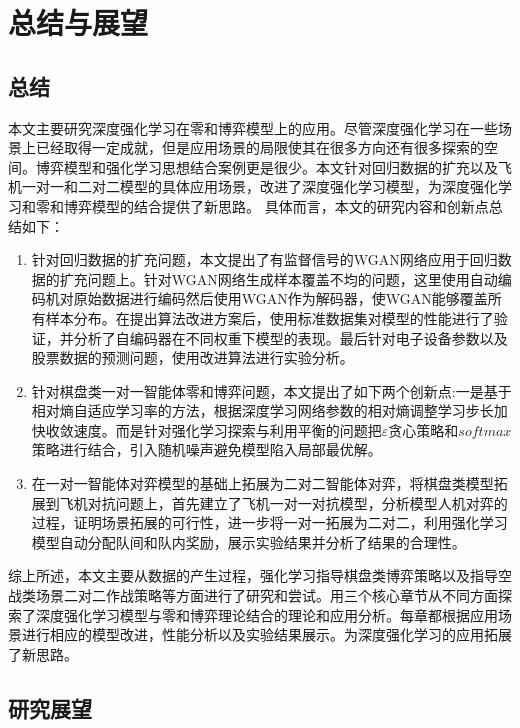 \chapter{总结与展望}
\section{总结}
本文主要研究深度强化学习在零和博弈模型上的应用。尽管深度强化学习在一些场景上已经取得一定成就，但是应用场景的局限使其在很多方向还有很多探索的空间。博弈模型和强化学习思想结合案例更是很少。本文针对回归数据的扩充以及飞机一对一和二对二模型的具体应用场景，改进了深度强化学习模型，为深度强化学习和零和博弈模型的结合提供了新思路。
具体而言，本文的研究内容和创新点总结如下：
\begin{enumerate}
	\item  针对回归数据的扩充问题，本文提出了有监督信号的WGAN网络应用于回归数据的扩充问题上。针对WGAN网络生成样本覆盖不均的问题，这里使用自动编码机对原始数据进行编码然后使用WGAN作为解码器，使WGAN能够覆盖所有样本分布。在提出算法改进方案后，使用标准数据集对模型的性能进行了验证，并分析了自编码器在不同权重下模型的表现。最后针对电子设备参数以及股票数据的预测问题，使用改进算法进行实验分析。
	\item 针对棋盘类一对一智能体零和博弈问题，本文提出了如下两个创新点:一是基于相对熵自适应学习率的方法，根据深度学习网络参数的相对熵调整学习步长加快收敛速度。而是针对强化学习探索与利用平衡的问题把$\varepsilon$贪心策略和$softmax$策略进行结合，引入随机噪声避免模型陷入局部最优解。
	\item 在一对一智能体对弈模型的基础上拓展为二对二智能体对弈，将棋盘类模型拓展到飞机对抗问题上，首先建立了飞机一对一对抗模型，分析模型人机对弈的过程，证明场景拓展的可行性，进一步将一对一拓展为二对二，利用强化学习模型自动分配队间和队内奖励，展示实验结果并分析了结果的合理性。
\end{enumerate}

综上所述，本文主要从数据的产生过程，强化学习指导棋盘类博弈策略以及指导空战类场景二对二作战策略等方面进行了研究和尝试。用三个核心章节从不同方面探索了深度强化学习模型与零和博弈理论结合的理论和应用分析。每章都根据应用场景进行相应的模型改进，性能分析以及实验结果展示。为深度强化学习的应用拓展了新思路。

\section{研究展望}

